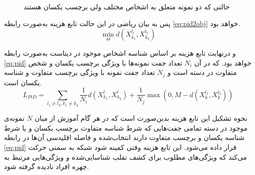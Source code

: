 \begin{figure}[ht]

	\caption{حالتی که دو نمونه متعلق به اشخاص مختلف ولی برچسب یکسان هستند}
	\label{fig:pid2}
\end{figure}
پس به بیان ریاضی در این حالت تابع هزینه به‌صورت رابطه
\ref{eq:pid2obj}
خواهد بود.
\begin{equation}\label{eq:pid2obj}
\min_{\Theta} {d( X_{k_1}^{l_1},X_{k_2}^{l_2} )} 
\end{equation}

  و در‌نهایت تابع هزینه بر اساس شناسه اشخاص موجود در دیتاست به‌صورت رابطه
\ref{eq:pid}
  خواهد بود. که در آن  
 $N_i$
   تعداد جفت نمونه‌ها با ویژگی برچسب یکسان و شخص متفاوت در دسته است و 
   $N_j$
       تعداد جفت نمونه با ویژگی برچسب متفاوت و شناسه یکسان است.
\begin{equation}\label{eq:pid}
  	L_{PiD} = \sum_{l_1 \ne l_2,k_1 \ne k_2}{\frac{1}{N_i}d( X_{k_1}^{l},X_{k_2}^{l})+\frac{1}{N_j}\max(0,M-d( X_{k}^{l_1},X_{k}^{l_2} ))}
\end{equation}

 نحوه تشکیل این تابع هزینه بدین‌صورت است که در هر گام آموزش از میان $N$ نمونه‌ی موجود در دسته تمامی جفت‌هایی که شرط شناسه متفاوت برچسب یکسان و یا شرط شناسه یکسان و برچسب متفاوت دارند انتخاب‌شده و فاصله اقلیدسی آن‌ها در رابطه
\ref{eq:pid}
 قرار داده می‌شود. این تابع هزینه وقتی کمینه شود شبکه به سمتی حرکت می‌کند که ویژگی‌های مطلوب برای کشف تقلب شناسایی‌شده و ویژگی‌هایی مرتبط به چهره افراد نادیده گرفته شود.
 
